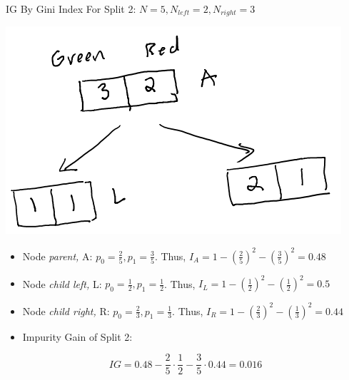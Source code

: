 \documentclass[
  ignorenonframetext,
]{beamer}
\begin{document}
\begin{frame}{IG By Gini Index}
\protect\hypertarget{ig-by-gini-index-1}{}
For Split 2: \(N = 5, N_{left} =2, N_{right} = 3\)

\includegraphics{images/im3.png}

\begin{itemize}
\item
  Node \emph{parent,} A: \(p_0 = \frac{2}{5}, p_1 = \frac{3}{5}\). Thus,
  \(I_{A} = 1-(\frac{2}{5})^2- (\frac{3}{5})^2 = 0.48\)
\item
  Node \emph{child left,} L: \(p_0 = \frac{1}{2}, p_1 = \frac{1}{2}\).
  Thus, \(I_{L} = 1- (\frac{1}{2})^2-(\frac{1}{2})^2=0.5\)
\item
  Node \emph{child right,} R: \(p_0 = \frac{2}{3}, p_1 = \frac{1}{3}\).
  Thus, \(I_{R} = 1-(\frac{2}{3})^2 -(\frac{1}{3})^2 = 0.44\)
\item
  Impurity Gain of Split 2:
\end{itemize}

\[IG = 0.48 - \frac{2}{5} \cdot \frac{1}{2}-\frac{3}{5} \cdot 0.44 = 0.016\]
\end{frame}
\end{document}
